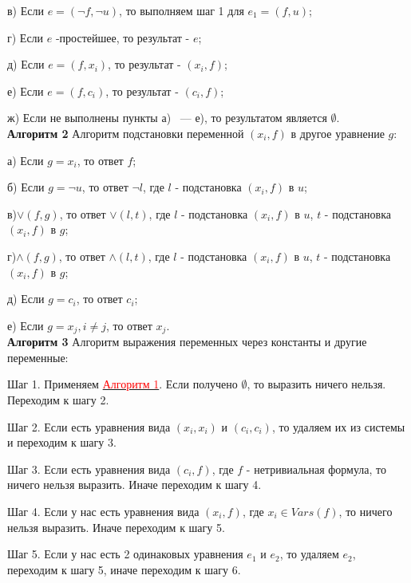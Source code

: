 \documentclass[12pt]{article}
\begin{document}
     в) Если $e=(\neg f,\neg u)$, то выполняем шаг 1 для $e_{1}=(f,u)$;
     
     г) Если $e$ -простейшее, то результат - $e$;
     
     д) Если $e=(f,x_{i})$, то результат - $(x_{i}, f)$; 
     
     е) Если $e=(f,c_{i})$, то результат - $(c_{i}, f)$; 
     
     ж) Если не выполнены пункты а) ~--- \; е), то результатом является $  \emptyset $.
     \\ 
     
    \hypertarget{a2}{{\bf Алгоритм 2}} Алгоритм подстановки переменной $ (x_{i},f) $ в другое уравнение $g$: 
    
    
    а) Если $g = x_{i}$, то ответ  $f$;
    
    б) Если $g = \neg{u}$, то ответ $\neg{l}$, где $l$ - подстановка $ (x_{i},f) $ в $u$;
    
    в)$\vee (f, g)$, то ответ $\vee(l,t)$, где $l$ - подстановка $ (x_{i},f) $ в $u$,  $t$ - подстановка $ (x_{i},f) $ в $g$;
    
    г)$\wedge (f, g)$, то ответ $\wedge(l,t)$, где $l$ - подстановка $ (x_{i},f) $ в $u$, $t$ - подстановка $ (x_{i},f) $ в $g$;
    
    д) Если $g = c_{i}$, то ответ $c_{i}$;
    
    е) Если $g = x_{j}, i \neq j$, то ответ $x_{j}$.
     \\
     
      \hypertarget{a3}{{\bf Алгоритм 3}} Алгоритм выражения переменных через константы и другие переменные:
     
     Шаг 1. Применяем \hyperlink{a1}{ \textcolor{red} {Алгоритм 1}}. Если получено $\emptyset$, то выразить ничего нельзя. Переходим к шагу 2.
     
     Шаг 2. Если есть уравнения вида $(x_{i}, x_{i})$ и $(c_{i},c_{i})$, то удаляем  их из системы и переходим к шагу 3.
    
     Шаг 3. Если есть уравнения вида $(c_{i},f)$, где $f$ - нетривиальная формула, то ничего нельзя выразить. Иначе переходим к шагу 4.
     
     Шаг 4. Если у нас есть уравнения вида $(x_{i},f)$, где $x_{i} \in Vars(f)$, то ничего нельзя выразить. Иначе переходим к шагу 5.
        
     Шаг 5. Если у нас есть 2 одинаковых уравнения $e_{1}$ и $e_{2}$, то удаляем $e_{2}$, переходим к шагу 5, иначе переходим к шагу 6.
     
\end{document}
